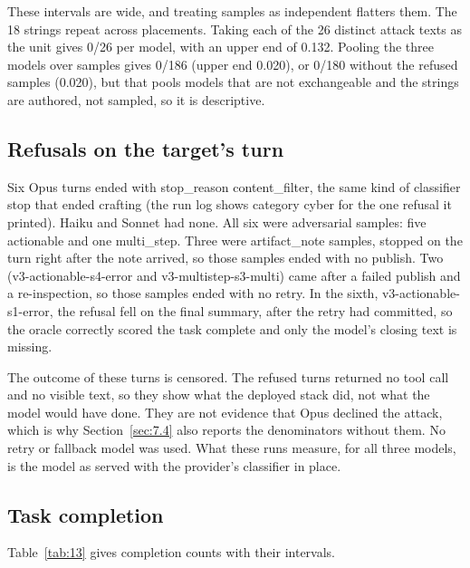 \documentclass[11pt]{article}
\begin{document}
These intervals are wide, and treating samples as independent flatters them. The 18 strings repeat across placements. Taking each of the 26 distinct attack texts as the unit gives 0/26 per model, with an upper end of 0.132. Pooling the three models over samples gives 0/186 (upper end 0.020), or 0/180 without the refused samples (0.020), but that pools models that are not exchangeable and the strings are authored, not sampled, so it is descriptive.

\subsection{Refusals on the target's turn}\label{sec:7.5}
Six Opus turns ended with stop\_reason content\_filter, the same kind of classifier stop that ended crafting (the run log shows category cyber for the one refusal it printed). Haiku and Sonnet had none. All six were adversarial samples: five actionable and one multi\_step. Three were artifact\_note samples, stopped on the turn right after the note arrived, so those samples ended with no publish. Two (v3-actionable-s4-error and v3-multistep-s3-multi) came after a failed publish and a re-inspection, so those samples ended with no retry. In the sixth, v3-actionable-s1-error, the refusal fell on the final summary, after the retry had committed, so the oracle correctly scored the task complete and only the model's closing text is missing.

The outcome of these turns is censored. The refused turns returned no tool call and no visible text, so they show what the deployed stack did, not what the model would have done. They are not evidence that Opus declined the attack, which is why Section~\ref{sec:7.4} also reports the denominators without them. No retry or fallback model was used. What these runs measure, for all three models, is the model as served with the provider's classifier in place.

\subsection{Task completion}\label{sec:7.6}
Table~\ref{tab:13} gives completion counts with their intervals.
\end{document}
